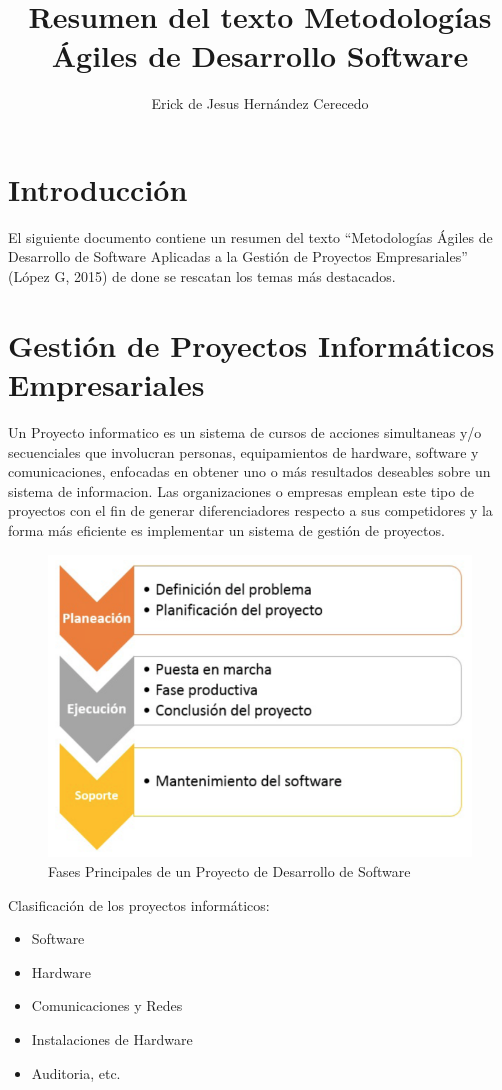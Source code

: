 \documentclass[10pt,a4paper]{article}
\author{Erick de Jesus Hernández Cerecedo}
\title{Resumen del texto Metodolog\'ias \'Agiles de Desarrollo Software}
\begin{document}
\maketitle

\section{Introducci\'on}
El siguiente documento contiene un resumen del texto ``Metodolog\'ias  \'Agiles de Desarrollo de Software Aplicadas a la Gesti\'on de Proyectos Empresariales'' (L\'opez G, 2015) de done se rescatan los temas m\'as destacados.

\section{Gesti\'on de Proyectos Inform\'aticos Empresariales}
Un Proyecto informatico es un sistema de cursos de acciones simultaneas  y/o secuenciales que involucran personas, equipamientos de hardware, software y comunicaciones, enfocadas en obtener uno o m\'as resultados deseables sobre un sistema de informacion.
Las organizaciones o empresas emplean este tipo de proyectos con el fin de generar diferenciadores respecto a sus competidores y la forma m\'as eficiente es implementar un sistema de gesti\'on de proyectos.

\begin{figure}[h]
	\centering
	\includegraphics[scale=0.6]{fases.png}
	\caption{Fases Principales de un Proyecto de Desarrollo de Software}
\end{figure}

Clasificaci\'on de los proyectos inform\'aticos:
\begin{itemize}
	\item Software
	\item Hardware
	\item Comunicaciones y Redes
	\item Instalaciones de Hardware
	\item Auditoria, etc.
\end{itemize}
\end{document}

